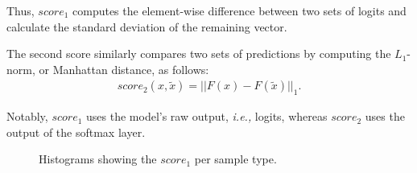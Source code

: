 Thus, $score_{1}$ computes the element-wise difference between two sets of
logits and calculate the standard deviation of the remaining vector.

The second score similarly compares two sets of predictions by computing the
$L_1$-norm, or Manhattan distance, as follows:
\begin{align}
    \label{eq:score2}
    score_{2}{(x,\tilde{x})}=||F(x)-F(\tilde{x})||_{1}.
\end{align}

Notably, $score_{1}$ uses the model's raw output, \emph{i.e.,} logits, whereas
$score_{2}$ uses the output of the softmax layer.

\begin{figure}[htp]


    \caption{Histograms showing the $score_{1}$ per sample type.}
    \label{fig:score_1}
\end{figure}


